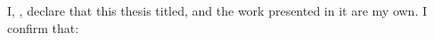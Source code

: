 \documentclass[
11pt, %
oneside, %
english, %
singlespacing, %
]{macthesis} %
\def\blankpage{%
      \clearpage%
      \thispagestyle{empty}%
      \addtocounter{page}{-1}%
      \null%
      \clearpage}
\begin{document}
\blankpage
\clearpage


\tableofcontents %

\listoffigures %

\listoftables %


\begin{declaration}
\addchaptertocentry{\authorshipname}

\noindent I, \authorname, declare that this thesis titled, \emph{\ttitle} and the work presented in it are my own. I confirm that:



\end{declaration}

\label{lastoffront}
\clearpage

\end{document}
